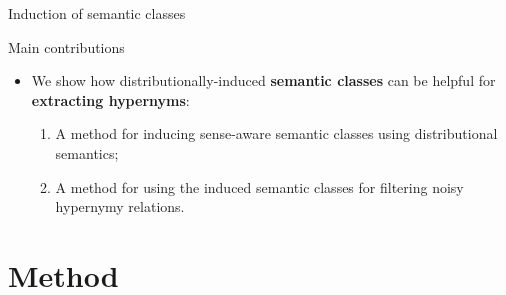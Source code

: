 \documentclass[usenames,dvipsnames,notes]{beamer}
\begin{document}
\begin{frame}{Induction of semantic classes}

%

\end{frame}


\begin{frame}{Main contributions}

\begin{itemize}
	\item We show how distributionally-induced \alert{\textbf{semantic classes}} can be helpful  for \alert{\textbf{extracting hypernyms}}:
	\pause
	\vspace{10pt}
	\begin{enumerate}
		\item A method for \alert{inducing sense-aware semantic classes} using distributional semantics; 
		\vspace{10pt}
		\item A method for using the induced semantic classes for \alert{filtering noisy hypernymy relations}.
	 \end{enumerate}
\end{itemize}
\end{frame}

\section{Method}
\subsection{}
\end{document}
